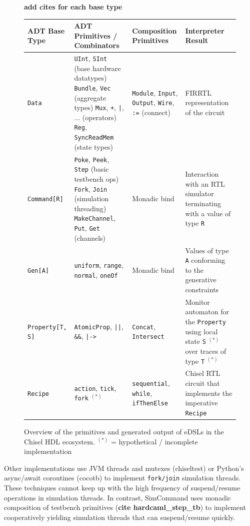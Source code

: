 \documentclass[sigplan,review,nonacm,9pt]{acmart}
\begin{document}
\begin{figure}
\textbf{add cites for each base type}
\begin{tabular}{p{2.5cm}p{5cm}p{3cm}p{4cm}}\toprule
ADT Base Type & ADT Primitives / Combinators & Composition Primitives & Interpreter Result\\\midrule
\texttt{Data} & \texttt{UInt}, \texttt{SInt} (base hardware datatypes) \newline \texttt{Bundle}, \texttt{Vec} (aggregate types) \newline \texttt{Mux}, \texttt{+}, \texttt{|}, $\dots$ (operators) \newline \texttt{Reg}, \texttt{SyncReadMem} (state types) & \texttt{Module}, \texttt{Input}, \texttt{Output}, \texttt{Wire}, \texttt{:=} (connect) & FIRRTL representation of the circuit\\\midrule
\texttt{Command[R]} & \texttt{Poke}, \texttt{Peek}, \texttt{Step} (basic testbench ops) \newline \texttt{Fork}, \texttt{Join} (simulation threading) \newline \texttt{MakeChannel}, \texttt{Put}, \texttt{Get} (channels) & Monadic bind & Interaction with an RTL simulator terminating with a value of type \texttt{R}\\\midrule
\texttt{Gen[A]} & \texttt{uniform}, \texttt{range}, \texttt{normal}, \texttt{oneOf} & Monadic bind & Values of type \texttt{A} conforming to the generative constraints\\\midrule
\texttt{Property[T, S]} & \texttt{AtomicProp}, \texttt{||}, \texttt{\&\&}, \texttt{|->} & \texttt{Concat}, \texttt{Intersect} & Monitor automaton for the \texttt{Property} using local state \texttt{S} $^{(\ast)}$ over traces of type \texttt{T} $^{(\ast)}$\\\midrule
\texttt{Recipe} & \texttt{action}, \texttt{tick}, \texttt{fork} $^{(\ast)}$ & \texttt{sequential}, \texttt{while}, \texttt{ifThenElse} & Chisel RTL circuit that implements the imperative \texttt{Recipe} \\
\bottomrule
\end{tabular}
\caption{Overview of the primitives and generated output of eDSLs in the Chisel HDL ecosystem. {\small $^{(\ast)}$ = hypothetical / incomplete implementation}}
\end{figure}

Other implementations use JVM threads and mutexes (chiseltest) or Python's async/await coroutines (cocotb) to implement \texttt{fork/join} simulation threads.
These techniques cannot keep up with the high frequency of suspend/resume operations in simulation threads.
In contrast, SimCommand uses monadic composition of testbench primitives (\textbf{cite hardcaml\_step\_tb}) to implement cooperatively yielding simulation threads that can suspend/resume quickly.
\end{document}
